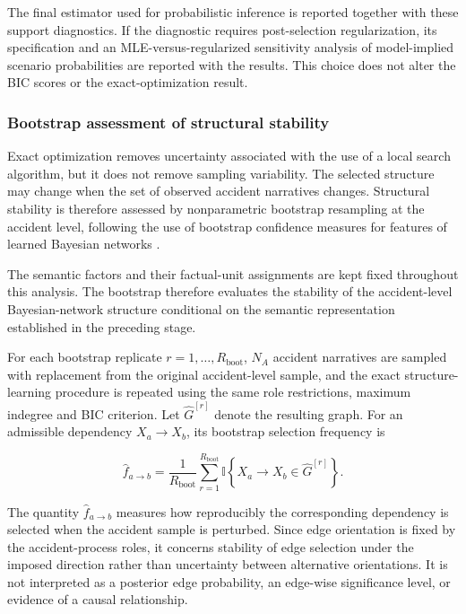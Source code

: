 The final estimator used for probabilistic inference is reported together
with these support diagnostics. If the diagnostic requires post-selection
regularization, its specification and an MLE-versus-regularized sensitivity
analysis of model-implied scenario probabilities are reported with the
results. This choice does not alter the BIC scores or the exact-optimization
result.


\subsubsection{Bootstrap assessment of structural stability}
\label{sec:chap4_global_bn_bootstrap}

Exact optimization removes uncertainty associated with the use of a local
search algorithm, but it does not remove sampling variability. The selected
structure may change when the set of observed accident narratives changes.
Structural stability is therefore assessed by nonparametric bootstrap
resampling at the accident level, following the use of bootstrap confidence
measures for features of learned Bayesian networks
\citep{friedman1999data}.

The semantic factors and their factual-unit assignments are kept fixed
throughout this analysis. The bootstrap therefore evaluates the stability of
the accident-level Bayesian-network structure conditional on the semantic
representation established in the preceding stage.

For each bootstrap replicate
\(r=1,\ldots,R_{\mathrm{boot}}\),
\(N_A\) accident narratives are sampled with replacement from the original
accident-level sample, and the exact structure-learning procedure is repeated
using the same role restrictions, maximum indegree and BIC criterion. Let
\(\widehat G^{[r]}\) denote the resulting graph. For an admissible dependency
\(X_a\rightarrow X_b\), its bootstrap selection frequency is

\[
\widehat f_{a\rightarrow b}
=
\frac{1}{R_{\mathrm{boot}}}
\sum_{r=1}^{R_{\mathrm{boot}}}
\mathbb I
\left\{
X_a\rightarrow X_b
\in
\widehat G^{[r]}
\right\}.
\]

The quantity
\(\widehat f_{a\rightarrow b}\)
measures how reproducibly the corresponding dependency is selected when the
accident sample is perturbed. Since edge orientation is fixed by the
accident-process roles, it concerns stability of edge selection under the
imposed direction rather than uncertainty between alternative orientations.
It is not interpreted as a posterior edge probability, an edge-wise
significance level, or evidence of a causal relationship.


